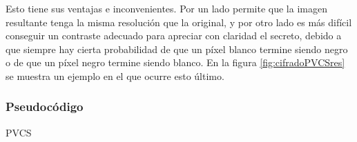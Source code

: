 Esto tiene sus ventajas e inconvenientes. Por un lado permite que la imagen
resultante tenga la misma resolución que la original, y por otro lado es más
difícil conseguir un contraste adecuado para apreciar con claridad el secreto,
debido a que siempre hay cierta probabilidad de que un píxel blanco termine
siendo negro o de que un píxel negro termine siendo blanco. En la figura
\ref{fig:cifradoPVCSres} se muestra un ejemplo en el que ocurre esto último.

\subsubsection{Pseudocódigo}
\begin{algorithm}[H]

	\Return{$[S_1,S_2,\cdots,S_N]$}
	\caption{PVCS}
	\label{alg:PVCS}
\end{algorithm}
\newpage

